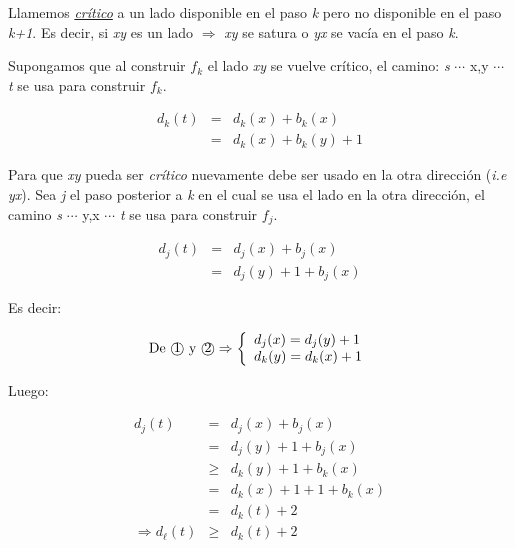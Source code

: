 \documentclass[12pt,a4paper]{report}
\begin{document}
		Llamemos \textit{\underline{crítico}} a un lado disponible en el paso \textit{k} pero no disponible en el paso \textit{k+1}. Es decir, si \textit{xy} es un lado $\Rightarrow$ \textit{xy} se satura o \textit{yx} se vacía en el paso \textit{k}.
		
		Supongamos que al construir $f_{k}$ el lado \textit{xy} se vuelve crítico, el camino: \textit{s} $\dotsb$ x,y $\dotsb$ \textit{t} se usa para construir $f_{k}$.

		\begin{eqnarray}
			 d_{k}(\textit{t}) & = & d_{k}(x)+ b_{k}(x) \\
			\nonumber & = & d_{k}(x)+b_{k}(y)+1
		\end{eqnarray}
		
		 Para que \textit{xy} pueda ser \textit{crítico} nuevamente debe ser usado en la otra dirección (\textit{i.e yx}). Sea \textit{j} el paso posterior a \textit{k} en el cual se usa el lado en la otra dirección, el camino \textit{s} $\dotsb$ y,x $\dotsb$ \textit{t} se usa para construir $f_{j}$.
		
		\begin{eqnarray}
			d_{j}(\textit{t}) & = & d_{j}(x)+ b_{j}(x) \\
			\nonumber & = & d_{j}(y)+1+b_{j}(x)
		\end{eqnarray}
		
		Es decir:
		
		\begin{equation*}
			\textup{De \textcircled{1} y \textcircled{2}} \Rightarrow
  			\left\lbrace
  			\begin{array}{l}
    		 d_{j}(x) = d_{j}(y)+1 \\
     		 d_{k}(y) = d_{k}(x)+1 \\
  			\end{array}
 			 \right.
		\end{equation*}
		
		Luego:

		\begin{eqnarray}
			d_{j}(\textit{t}) & = & d_{j}(x)+ b_{j}(x) \\
			& = & d_{j}(y)+1+b_{j}(x) \\
			& \geq & d_{k}(y)+1+b_{k}(x) \\
			& = & d_{k}(x)+1+1+b_{k}(x) \\
			& = & d_{k}(\textit{t})+2 \\
			\Rightarrow d_{\ell}(\textit{t}) & \geq & d_{k}(\textit{t})+2
		\end{eqnarray}
		
\end{document}

